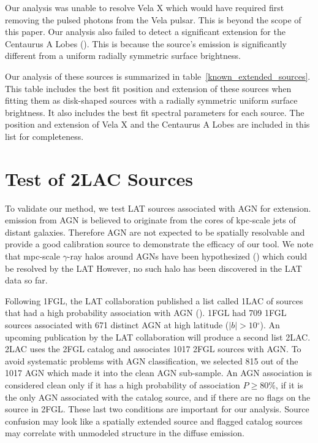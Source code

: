 \documentclass[12pt,preprint]{aastex}
\newcommand{\gev}{\text{GeV}\xspace}
\renewcommand{\deg}{\ensuremath{^\circ}\xspace}
\begin{document}
Our analysis was unable to resolve Vela X which would have required first
removing the pulsed photons from the Vela pulsar. This is beyond the
scope of this paper.  Our analysis also failed to detect a significant
extension for the Centaurus A Lobes (\cite{cen_a_lat}). This is because
the source's emission is significantly different from a uniform
radially symmetric surface brightness.

Our analysis of these sources is summarized in
table~\ref{known_extended_sources}.  This table includes the best fit
position and extension of these sources when fitting them as disk-shaped
sources with a radially symmetric uniform surface brightness. It also
includes the best fit spectral parameters for each source.  The position
and extension of Vela X and the Centaurus A Lobes are included in this
list for completeness.

\section{Test of 2LAC Sources}
\label{test_2lac_sources}

To validate our method, we test LAT sources associated with AGN for
extension.  \gev emission from AGN is believed to originate from the cores
of kpc-scale jets of distant galaxies.  Therefore AGN are not expected
to be spatially resolvable and provide a good calibration source to
demonstrate the efficacy of our tool.  We note that mpc-scale $\gamma$-ray
halos around AGNs have been hypothesized (\cite{pair_halo_paper}) which
could be resolved by the LAT However, no such halo has been discovered
in the LAT data so far.

Following 1FGL, the LAT collaboration published a list called 1LAC
of sources that
had a high probability association with AGN (\cite{first_agn_cat}).
1FGL had 709 1FGL sources associated with 671 distinct AGN at high
latitude ($|b|>10\deg$).  An upcoming publication by the LAT collaboration
will produce a second list 2LAC. 2LAC 
uses the 2FGL catalog and associates 1017 2FGL sources
with AGN.  To avoid systematic problems with AGN classification, we
selected 815 out of the 1017 AGN which made it into the clean AGN sub-sample.  An AGN
association is considered clean only if it has a high probability
of association $P\ge 80\%$, if it is the only AGN associated with the
catalog source, and if there are no flags on the source in 2FGL. These
last two conditions are important for our analysis. Source
confusion may look like a spatially extended source and flagged catalog
sources may correlate with unmodeled structure in the diffuse emission.
\end{document}
